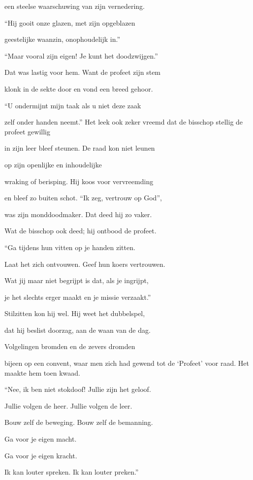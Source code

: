 een steelse waarschuwing
van zijn vernedering.

“Hij gooit onze glazen,
met zijn opgeblazen

geestelijke waanzin,
onophoudelijk in.”

“Maar vooral zijn eigen!
Je kunt het doodzwijgen.”

Dat was lastig voor hem.
Want de profeet zijn stem

klonk in de sekte door
en vond een breed gehoor.

“U ondermijnt mijn taak
als u niet deze zaak

zelf onder handen neemt.”
Het leek ook zeker vreemd
dat de bisschop stellig
de profeet gewillig

in zijn leer bleef steunen.
De raad kon niet leunen

op zijn openlijke
en inhoudelijke

wraking of berisping.
Hij koos voor vervreemding

en bleef zo buiten schot.
“Ik zeg, vertrouw op God”,

was zijn monddoodmaker.
Dat deed hij zo vaker.

Wat de bisschop ook deed;
hij ontbood de profeet.

“Ga tijdens hun vitten
op je handen zitten.

Laat het zich ontvouwen.
Geef hun koers vertrouwen.

Wat jij maar niet begrijpt
is dat, als je ingrijpt,

je het slechts erger maakt
en je missie verzaakt.”

Stilzitten kon hij wel.
Hij weet het dubbelspel,

dat hij beslist doorzag,
aan de waan van de dag.

Volgelingen bromden
en de zevers dromden

bijeen op een convent,
waar men zich had gewend
tot de ‘Profeet’ voor raad.
Het maakte hem toen kwaad.

“Nee, ik ben niet stokdoof!
Jullie zijn het geloof.

Jullie volgen de heer.
Jullie volgen de leer.

Bouw zelf de beweging.
Bouw zelf de bemanning.

Ga voor je eigen macht.

Ga voor je eigen kracht.

Ik kan louter spreken.
Ik kan louter preken.”

